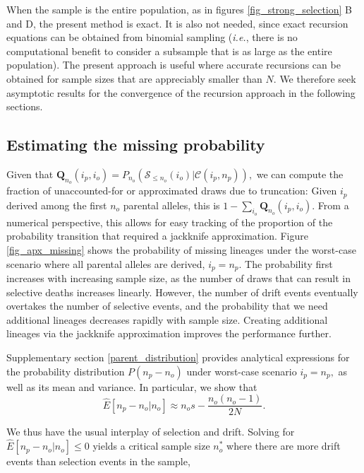 \documentclass[9pt,twocolumn,twoside,lineno]{gsajnl}
\begin{document}
When the sample is the entire population, as in figures \ref{fig_strong_selection} B and D, the
present method is exact. It is also not needed, since exact recursion equations can be obtained 
from binomial sampling (\textit{i.e.}, there is no computational benefit to consider a subsample that is as
large as the entire population).  The present approach is useful where accurate recursions can be
obtained for sample sizes that are appreciably smaller than $N$. We therefore seek asymptotic
results for the convergence of the recursion approach in the following sections.

\subsection{Estimating the missing probability}
\label{subsec_missing}


Given that $ \mathbf{Q}_{n_o}(i_p, i_o) = P_{n_o}(\mathcal{S}_{\leq n_o} (i_o)|
\mathcal{C}(i_p,n_p)),$ we can compute the fraction of unaccounted-for or approximated draws 
due to truncation:
Given $i_p$ derived among the first $n_o$ parental alleles, this is $1-\sum_{i_o} \mathbf{Q}_{n_o}(i_p,
i_o).$ From a numerical perspective, this allows for easy tracking of the proportion of the probability
transition that required a jackknife approximation. 
Figure \ref{fig_apx_missing} shows the probability of missing lineages under the worst-case
scenario where all parental alleles are derived, $i_p = n_p.$ 
The probability first increases with increasing sample size, as the number of draws that
can result in selective deaths increases linearly. However, the number of drift events eventually overtakes
the number of selective events, and the probability that we need additional lineages decreases
rapidly with sample size. Creating additional lineages via the jackknife approximation improves the performance further.

Supplementary section \ref{parent_distribution} provides analytical expressions for the probability distribution
$P(n_p-n_o) $ under worst-case scenario $i_p = n_p,$ as well as its
mean and variance. In particular, we show that
\begin{equation}
    \label{eq_lineages_approx}
    \hat{E}[n_p-n_o | n_o] \approx n_o  s - \frac{n_o (n_o-1) }{2N}.
\end{equation}

We thus have the usual interplay of selection and drift. Solving for $ \hat{E}[n_p -n_o | n_o]\leq0$
yields a critical sample size $n^*_o$ where there are more drift events than selection events in
the sample,
\end{document}
